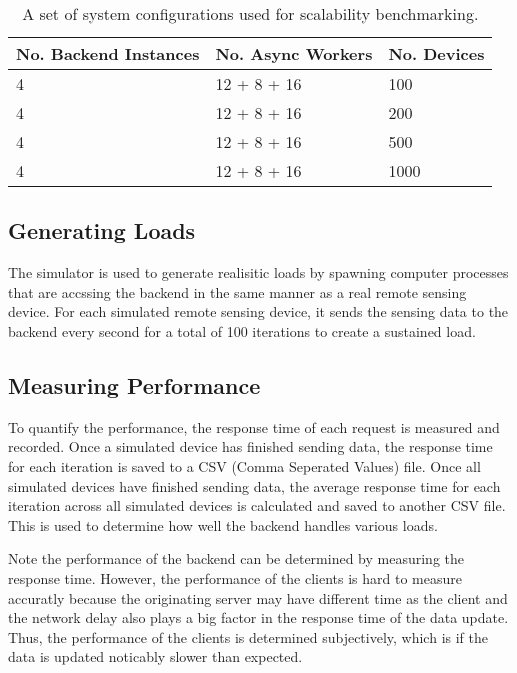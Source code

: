 \documentclass[../thesis.tex]{subfiles}
\begin{document}
\begin{table}[h!]
	\begin{center}
		\caption{A set of system configurations used for scalability benchmarking.}
		\label{tab:scalebench}
		\begin{tabular}{l|l|l}
			\toprule
			\textbf{No. Backend Instances} & \textbf{No. Async Workers} & \textbf{No. Devices}\\
			\midrule
			4 & 12 + 8 + 16 & 100\\
			4 & 12 + 8 + 16 & 200\\
			4 & 12 + 8 + 16 & 500\\
			4 & 12 + 8 + 16 & 1000\\
			\bottomrule
		\end{tabular}
	\end{center}
\end{table}

\subsection{Generating Loads}

The simulator is used to generate realisitic loads by spawning computer processes that are accssing the backend in the same manner as a real remote sensing device. For each simulated remote sensing device, it sends the sensing data to the backend every second for a total of 100 iterations to create a sustained load.

\subsection{Measuring Performance}

To quantify the performance, the response time of each request is measured and recorded. Once a simulated device has finished sending data, the response time for each iteration is saved to a CSV (Comma Seperated Values) file. Once all simulated devices have finished sending data, the average response time for each iteration across all simulated devices is calculated and saved to another CSV file. This is used to determine how well the backend handles various loads.

Note the performance of the backend can be determined by measuring the response time. However, the performance of the clients is hard to measure accuratly because the originating server may have different time as the client and the network delay also plays a big factor in the response time of the data update. Thus, the performance of the clients is determined subjectively, which is if the data is updated noticably slower than expected. 
\end{document}
